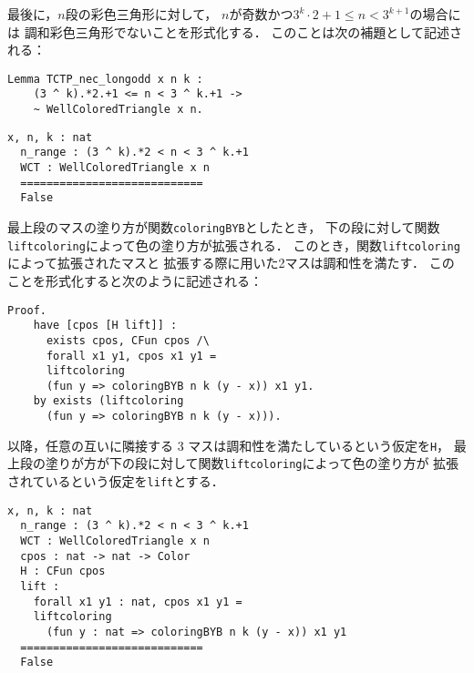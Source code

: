 最後に，$n$段の彩色三角形に対して，
$n$が奇数かつ$3^{k} \cdot 2 + 1 \leq n < 3^{k+1}$の場合には
調和彩色三角形でないことを形式化する．
このことは次の補題として記述される：
\begin{lstlisting}[language=Coq]
  Lemma TCTP_nec_longodd x n k :
    (3 ^ k).*2.+1 <= n < 3 ^ k.+1 ->
    ~ WellColoredTriangle x n.
\end{lstlisting}
\begin{lstlisting}[language=Coq]
  x, n, k : nat
  n_range : (3 ^ k).*2 < n < 3 ^ k.+1
  WCT : WellColoredTriangle x n
  ============================
  False
\end{lstlisting}
最上段のマスの塗り方が関数{\tt{coloringBYB}}としたとき，
下の段に対して関数{\tt{liftcoloring}}によって色の塗り方が拡張される．
このとき，関数{\tt{liftcoloring}}によって拡張されたマスと
拡張する際に用いた2マスは調和性を満たす．
このことを形式化すると次のように記述される：
\begin{lstlisting}[language=Coq]
  Proof.
    have [cpos [H lift]] :
      exists cpos, CFun cpos /\
      forall x1 y1, cpos x1 y1 =
      liftcoloring
      (fun y => coloringBYB n k (y - x)) x1 y1.
    by exists (liftcoloring
      (fun y => coloringBYB n k (y - x))).
\end{lstlisting}
以降，任意の互いに隣接する 3 マスは調和性を満たしているという仮定を{\tt{H}}，
最上段の塗りが方が下の段に対して関数{\tt{liftcoloring}}によって色の塗り方が
拡張されているという仮定を{\tt{lift}}とする．
\begin{lstlisting}[language=Coq]
  x, n, k : nat
  n_range : (3 ^ k).*2 < n < 3 ^ k.+1
  WCT : WellColoredTriangle x n
  cpos : nat -> nat -> Color
  H : CFun cpos
  lift :
    forall x1 y1 : nat, cpos x1 y1 =
    liftcoloring
      (fun y : nat => coloringBYB n k (y - x)) x1 y1
  ============================
  False
\end{lstlisting}
